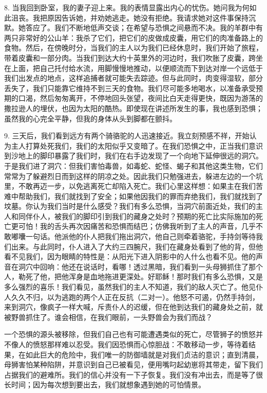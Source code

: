 8. 当我回到卧室，我的妻子迎上来。我的表情显露出内心的忧伤。她问我为何如此沮丧。我把原因告诉她，并劝她逃走。她没有拒绝。我请求她对这件事保持沉默。她答应了。我们不断地低声交谈；在希望与恐惧之间悬而不决。我的羊群中有两只非常好的公山羊：我杀了它们，把它们的皮做成皮囊，用它们的肉准备路上的食物。然后，在傍晚时分，当我们的主人以为我们已经休息时，我们开始了旅程，带着皮囊和一部分肉。当我们到达大约十英里外的河边时，我们吹胀了皮囊，跨坐在上面，把自己托付给水流，用脚慢慢地推动，以便顺流而下到达对岸一个远低于我们出发点的地点，这样追捕者就可能失去踪迹。但与此同时，肉变得湿软，部分丢失了，我们只能靠它维持不到三天的食物。我们尽可能多地喝水，以准备承受预期的口渴，然后匆匆离开，不停地回头张望，夜间比白天走得更快，既因为游荡的撒拉逊人的埋伏，也因为太阳的酷热。即使现在讲述所发生的事，我也感到恐惧；虽然我的心完全平静，但我的身体从头到脚都在颤抖。\par

9. 三天后，我们看到远方有两个骑骆驼的人迅速接近。我立刻预感不祥，开始认为主人打算处死我们，我们的太阳似乎又变暗了。在我们恐惧之中，正当我们意识到沙地上的脚印暴露了我们时，我们在右手边发现了一个向地下延伸很远的洞穴。于是我们进了洞穴：但我们害怕毒兽，如毒蛇、蛇怪、蝎子和其他这类生物，它们常常为了躲避烈日而到这样的阴凉之处。因此我们只勉强进去，躲进左边的一个坑里，不敢再迈一步，以免逃离死亡却陷入死亡。我们心里这样想：如果主在我们苦难中帮助我们，我们就找到了安全；如果他因我们的罪而弃绝我们，我们就找到了坟墓。你认为我们当时是什么感受？我们有多么恐惧，当洞穴前面近处，我们的主人和同伴仆人，被我们的脚印引到我们的藏身之处时？预期的死亡比实际施加的死亡更可怕！我的舌头再次因痛苦和恐惧而结巴；仿佛我听到了主人的声音，几乎不敢嘟囔一句话。他派他的仆人把我们拖出洞穴，他自己则牵着骆驼，手持剑等待我们出来。与此同时，仆人进入了大约三四腕尺，我们在藏身处看到了他的背，但他看不见我们，因为眼睛的特性是：从阳光下进入阴影中的人什么也看不见。他的声音在洞穴中回响：他还在说话时，看哪！透过黑暗，我们看到一头母狮抓住了那个人，勒死了他，把他浑身是血地拖进更深处。好耶稣！那时我们有多么恐惧，又是多么强烈的喜乐！我们看见，虽然我们的主人不知道，我们的敌人灭亡了。他见仆人久久不归，以为逃跑的两个人正在反抗（二对一）。他怒不可遏，仍然手持剑，来到洞穴，像疯子一样大喊，斥责仆人的迟缓，但在他到达我们的藏身处之前，就被野兽抓住了。谁会相信，在我们眼前，一头野兽会为我们而战？\par

一个恐惧的源头被移除，但我们自己也有可能遭遇类似的死亡，尽管狮子的愤怒并不像人的愤怒那样难以忍受。我们因恐惧而心惊胆战：不敢移动一步，等待着结果，在如此巨大的危险中，我们唯一的防御墙就是对我们贞洁的意识；直到清晨，母狮害怕某种陷阱，并意识到自己已被看见，便用嘴叼起幼崽将其带走，留下我们占据我们的避难所。我们的信心并没有一下子恢复。我们没有冲出去，而是等了很长时间；因为每次想到要出去，我们就想象遇到她的可怕情景。\par

